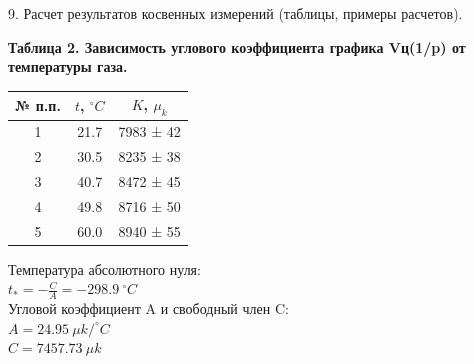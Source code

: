 \documentclass[12pt]{article}
\begin{document}
\begin{flushleft}
    9. Расчет результатов косвенных измерений (таблицы, примеры расчетов). \\

    \begin{center}
        \textbf{Таблица 2. Зависимость углового коэффициента графика Vц(1/p) от температуры газа.} \\
    \end{center}
    \begin{table}[h]
        \centering
        \begin{tabular}{|c|c|c|}
            \hline
            № п.п. & $ t $, $^\circ C $ & $ K $, $ \mu_k $ \\
            \hline
            1  & 21.7  & 7983 ± 42 \\
            \hline
            2  & 30.5  & 8235 ± 38 \\
            \hline
            3  & 40.7  & 8472 ± 45 \\
            \hline
            4  & 49.8  & 8716 ± 50 \\
            \hline
            5  & 60.0  & 8940 ± 55 \\
            \hline
        \end{tabular}
    \end{table}
    Температура абсолютного нуля: \\
    $t_* = -\frac{C}{A} = -298.9 \ ^\circ C $ \\
    Угловой коэффициент A и свободный член C: \\
    $ A = 24.95 \ \mu k/^\circ C $ \\
    $ C = 7457.73 \ \mu k $ \\


\end{flushleft}
\end{document}
